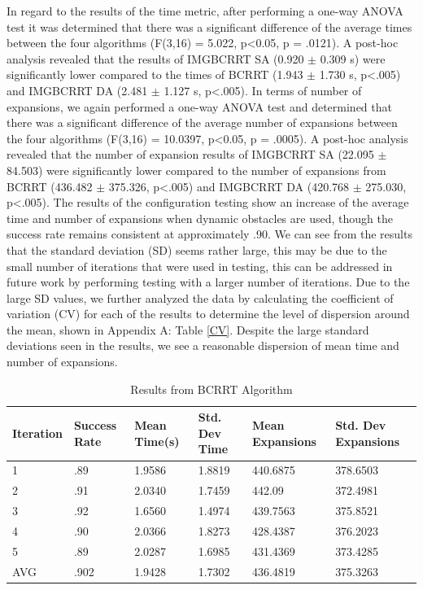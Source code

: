 \documentclass{article}
\begin{document}
In regard to the results of the time metric, after performing a one-way ANOVA test it was determined that there was a significant difference of the average times between the four algorithms (F(3,16) = 5.022, p<0.05, p = .0121). A post-hoc analysis revealed that the results of IMGBCRRT SA (0.920 $\pm$  0.309 s) were significantly lower compared to the times of BCRRT (1.943 $\pm$  1.730 s, p<.005) and IMGBCRRT DA (2.481 $\pm$  1.127 s, p<.005).  In terms of number of expansions, we again performed a one-way ANOVA test and determined that there was a significant difference of the average number of expansions between the four algorithms  (F(3,16) = 10.0397, p<0.05, p = .0005). A post-hoc analysis revealed that the number of expansion results of IMGBCRRT SA (22.095 $\pm$  84.503) were significantly lower compared to the number of expansions from BCRRT (436.482 $\pm$  375.326, p<.005) and IMGBCRRT DA (420.768 $\pm$  275.030, p<.005). The results of the configuration testing show an increase of the average time and number of expansions when dynamic obstacles are used, though the success rate remains consistent at approximately .90. We can see from the results that the standard deviation (SD) seems rather large, this may be due to the small number of iterations that were used in testing, this can be addressed in future work by performing testing with a larger number of iterations. Due to the large SD values, we further analyzed the data by calculating the coefficient of variation (CV) for each of the results to determine the level of dispersion around the mean, shown in Appendix A: Table \ref{CV}. Despite the large standard deviations seen in the results, we see a reasonable dispersion of mean time and number of expansions. 

\begin{table}[hbt!]
  \caption{Results from BCRRT Algorithm}
  \label{BCRRT Results}
  \centering
  \begin{tabular}{llllll}
    \cmidrule(r){1-6}
   Iteration & Success Rate & Mean Time(s) & Std. Dev Time & Mean Expansions & Std. Dev Expansions\\
    \midrule
    1 & .89 & 1.9586 & 1.8819 & 440.6875 & 378.6503 \\
    2 & .91 & 2.0340 & 1.7459 & 442.09 & 372.4981 \\
    3 & .92 & 1.6560 & 1.4974 & 439.7563 & 375.8521 \\
    4 & .90 & 2.0366 & 1.8273 & 428.4387 & 376.2023 \\
    5 & .89 & 2.0287 & 1.6985 & 431.4369 & 373.4285 \\
 \midrule
  AVG & .902 & 1.9428 & 1.7302 & 436.4819 & 375.3263 \\
    \bottomrule
  \end{tabular}
\end{table}
\end{document}
